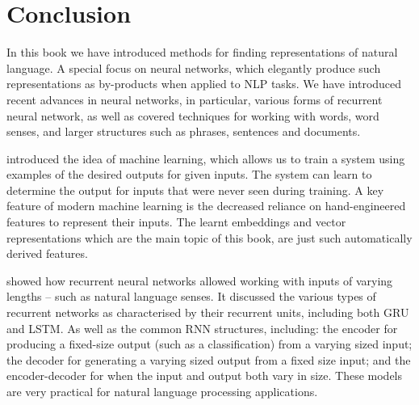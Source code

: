 \documentclass[12pt,parskip]{komatufte}
\begin{document}
\chapter{Conclusion}\label{sec:conclusion}

In this book we have introduced methods for finding representations of natural language.
A special  focus on neural networks, which elegantly produce such representations as by-products when applied to  NLP tasks.
We have introduced recent advances in neural networks, in particular, various forms of recurrent neural network,
as well as covered techniques for working with words, word senses, and larger structures such as phrases, sentences and documents.





 introduced the idea of machine learning,
which allows us to train a system using examples of the desired outputs for given inputs.
The system can learn to determine the output for inputs that were never seen during training.
A key feature of modern machine learning is the decreased reliance on hand-engineered features to represent their inputs.
The learnt embeddings and vector representations which are the main topic of this book, are just such automatically derived features.


 showed how recurrent neural networks allowed working with inputs of varying lengths -- such as natural language senses.
It discussed the various types of recurrent networks as characterised by their recurrent units, including both GRU and LSTM.
As well as the common RNN structures, including:
the encoder for producing a fixed-size  output (such as a classification) from a varying sized input;
the decoder for generating a varying sized output from a fixed size input;
and the encoder-decoder for when the input and output both vary in size.
These models are very practical for natural language processing applications.
\end{document}

